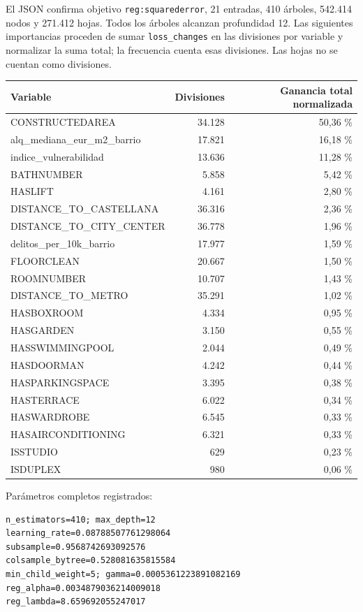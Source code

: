 \documentclass[11pt,a4paper]{article}
\newcommand{\fuente}[1]{\par\vspace{2pt}{\footnotesize\itshape #1}\par}
\newcommand{\thead}[1]{\textbf{#1}}
\begin{document}
El JSON confirma objetivo \texttt{reg:squarederror}, 21 entradas, 410 árboles, 542.414 nodos y 271.412 hojas. Todos los árboles alcanzan profundidad 12. Las siguientes importancias proceden de sumar \texttt{loss\_changes} en las divisiones por variable y normalizar la suma total; la frecuencia cuenta esas divisiones. Las hojas no se cuentan como divisiones.

\begin{center}
\begin{tabularx}{\linewidth}{@{}L r r@{}}
\toprule
\thead{Variable} & \thead{Divisiones} & \thead{Ganancia total normalizada} \\
\midrule
CONSTRUCTEDAREA & 34.128 & 50,36 \% \\
alq\_mediana\_eur\_m2\_barrio & 17.821 & 16,18 \% \\
indice\_vulnerabilidad & 13.636 & 11,28 \% \\
BATHNUMBER & 5.858 & 5,42 \% \\
HASLIFT & 4.161 & 2,80 \% \\
DISTANCE\_TO\_CASTELLANA & 36.316 & 2,36 \% \\
DISTANCE\_TO\_CITY\_CENTER & 36.778 & 1,96 \% \\
delitos\_per\_10k\_barrio & 17.977 & 1,59 \% \\
FLOORCLEAN & 20.667 & 1,50 \% \\
ROOMNUMBER & 10.707 & 1,43 \% \\
DISTANCE\_TO\_METRO & 35.291 & 1,02 \% \\
HASBOXROOM & 4.334 & 0,95 \% \\
HASGARDEN & 3.150 & 0,55 \% \\
HASSWIMMINGPOOL & 2.044 & 0,49 \% \\
HASDOORMAN & 4.242 & 0,44 \% \\
HASPARKINGSPACE & 3.395 & 0,38 \% \\
HASTERRACE & 6.022 & 0,34 \% \\
HASWARDROBE & 6.545 & 0,33 \% \\
HASAIRCONDITIONING & 6.321 & 0,33 \% \\
ISSTUDIO & 629 & 0,23 \% \\
ISDUPLEX & 980 & 0,06 \% \\
\bottomrule
\end{tabularx}
\fuente{Fuente: elaboración propia a partir de modelo.json. La ganancia se calcula sumando loss\_changes en las divisiones de cada variable.}
\end{center}

Parámetros completos registrados:
\begin{lstlisting}
n_estimators=410; max_depth=12
learning_rate=0.08788507761298064
subsample=0.9568742693092576
colsample_bytree=0.528081635815584
min_child_weight=5; gamma=0.0005361223891082169
reg_alpha=0.0034879036214009018
reg_lambda=8.659692055247017
\end{lstlisting}
\end{document}

